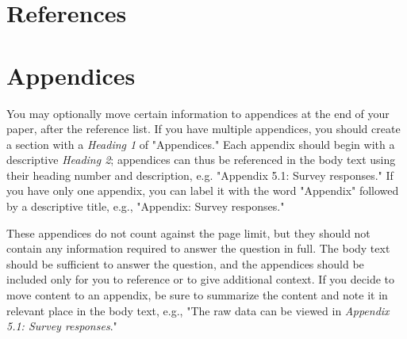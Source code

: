 \documentclass[
	letterpaper, %
]{jdf}
\begin{document}
\section{References}
\printbibliography[heading=none]

\section{Appendices}
You may optionally move certain information to appendices at the end of your paper, after the reference list. If you have multiple appendices, you should create a section 
with a \emph{Heading 1} of "Appendices." Each appendix should begin with a descriptive \emph{Heading 2}; appendices can thus be referenced in the body text using their 
heading number and description, e.g. "Appendix 5.1: Survey responses." If you have only one appendix, you can label it with the word "Appendix" followed by a descriptive 
title, e.g., "Appendix: Survey responses."

These appendices do not count against the page limit, but they should not contain any information required to answer the question in full. The body text should be sufficient 
to answer the question, and the appendices should be included only for you to reference or to give additional context. If you decide to move content to an appendix, be sure 
to summarize the content and note it in relevant place in the body text, e.g., "The raw data can be viewed in \emph{Appendix 5.1: Survey responses}."
\end{document}
